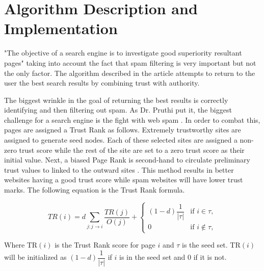 \documentclass[letter, 11pt]{article}
\begin{document}
\section*{Algorithm Description and Implementation}
\vspace{-10pt}
\begin{doublespace}
"The objective of a search engine is to investigate good superiority resultant pages" \cite[pg. 1]{Query} taking into account the fact that spam filtering is very important but not the only factor. The algorithm described in the article attempts to return to the user the best search results by combining trust with authority.

The biggest wrinkle in the goal of returning the best results is correctly identifying and then filtering out spam. As Dr. Pruthi put it, the biggest challenge for a search engine is the fight with web spam \cite[pg. 2]{Query}. In order to combat this, pages are assigned a Trust Rank as follows. Extremely trustworthy sites are assigned to generate seed nodes. Each of these selected sites are assigned a non-zero trust score while the rest of the site are set to a zero trust score as their initial value. Next, a biased Page Rank is second-hand to circulate preliminary trust values to linked to the outward sites \cite[pg. 2]{Query}. This method results in better websites having a good trust score while spam websites will have lower trust marks. The following equation is the Trust Rank formula.

\begin{equation}
\label{eq:1} TR(i) = d \sum_{j:j \rightarrow i} \dfrac{TR(j)}{O(j)} +
\left\{ \begin{array}{ll}
                   (1-d)\dfrac{1}{|\tau|}   & \mbox{if $i \in \tau$,}\\
                   0                        & \mbox{if $i \notin \tau$},
                 \end{array}
         \right. 
\end{equation}

Where TR$(i)$ is the Trust Rank score for page $i$ and $\tau$ is the seed set. TR$(i)$ will be initialized as $(1-d)\dfrac{1}{|\tau|}$ if $i$ is in the seed set and 0 if it is not.


\end{doublespace}
\end{document}
